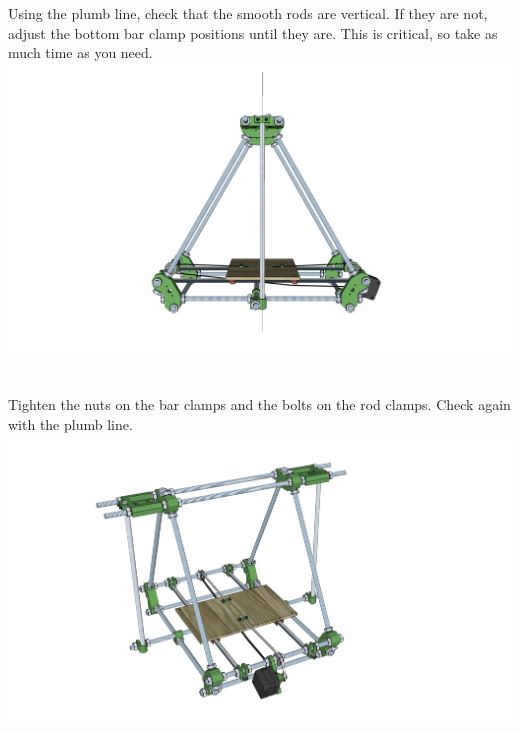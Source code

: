 \documentclass[twoside,openany,a4paper,titlepage]{memoir}
\begin{document}
	\section{}
	Using the plumb line, check that the smooth rods are vertical. If they are not, adjust the bottom bar
	clamp positions until they are. This is critical, so take as much time as you need.\\
	\includegraphics[width=1\linewidth]{graphics/ch8_7.png}
	
	\section{}
	Tighten the nuts on the bar clamps and the bolts on the rod clamps. Check again with the plumb line.\\
	\includegraphics[width=1\linewidth]{graphics/ch8_8.png}
	
\end{document}
